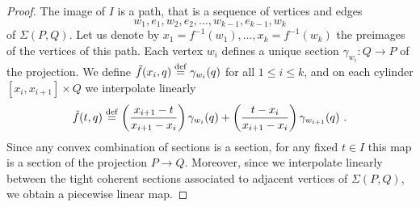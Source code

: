 \begin{proof}
	The image of $I$ is a path, that is a sequence of vertices and edges $$w_1,e_1,w_2,e_2,\ldots,w_{k-1},e_{k-1},w_k$$ of $\Sigma(P,Q)$.
	Let us denote by $x_1=f^{-1}(w_1),\ldots, x_k=f^{-1}(w_k)$ the preimages of the vertices of this path.
	Each vertex $w_i$ defines a unique section $\gamma_{w_i} : Q \to P$ of the projection.
	We define $\tilde f (x_i, q) \stackrel{\mathrm{def}}{=} \gamma_{w_i}(q)$ for all $1 \leq i \leq k$, and on each cylinder $[x_i,x_{i+1}] \times Q$ we interpolate linearly
	\[
	\tilde f (t,q) \defeq \left( \frac{x_{i+1}-t}{x_{i+1}-x_i} \right) \gamma_{w_i}(q) + \left( \frac{t-x_i}{x_{i+1}-x_i} \right) \gamma_{w_{i+1}}(q) \ .
	\]
	Since any convex combination of sections is a section, for any fixed $t\in I$ this map is a section of the projection $P \to Q$.
	Moreover, since we interpolate linearly between the tight coherent sections associated to adjacent vertices of $\Sigma(P,Q)$, we obtain a piecewise linear map.
\end{proof}

